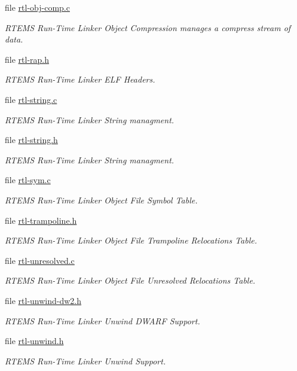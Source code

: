 \begin{DoxyCompactItemize}
file \mbox{\hyperlink{rtl-obj-comp_8c}{rtl-\/obj-\/comp.\+c}}
\begin{DoxyCompactList}\small\item\em R\+T\+E\+MS Run-\/\+Time Linker Object Compression manages a compress stream of data. \end{DoxyCompactList}\item 
file \mbox{\hyperlink{rtl-rap_8h}{rtl-\/rap.\+h}}
\begin{DoxyCompactList}\small\item\em R\+T\+E\+MS Run-\/\+Time Linker E\+LF Headers. \end{DoxyCompactList}\item 
file \mbox{\hyperlink{rtl-string_8c}{rtl-\/string.\+c}}
\begin{DoxyCompactList}\small\item\em R\+T\+E\+MS Run-\/\+Time Linker String managment. \end{DoxyCompactList}\item 
file \mbox{\hyperlink{rtl-string_8h}{rtl-\/string.\+h}}
\begin{DoxyCompactList}\small\item\em R\+T\+E\+MS Run-\/\+Time Linker String managment. \end{DoxyCompactList}\item 
file \mbox{\hyperlink{rtl-sym_8c}{rtl-\/sym.\+c}}
\begin{DoxyCompactList}\small\item\em R\+T\+E\+MS Run-\/\+Time Linker Object File Symbol Table. \end{DoxyCompactList}\item 
file \mbox{\hyperlink{rtl-trampoline_8h}{rtl-\/trampoline.\+h}}
\begin{DoxyCompactList}\small\item\em R\+T\+E\+MS Run-\/\+Time Linker Object File Trampoline Relocations Table. \end{DoxyCompactList}\item 
file \mbox{\hyperlink{rtl-unresolved_8c}{rtl-\/unresolved.\+c}}
\begin{DoxyCompactList}\small\item\em R\+T\+E\+MS Run-\/\+Time Linker Object File Unresolved Relocations Table. \end{DoxyCompactList}\item 
file \mbox{\hyperlink{rtl-unwind-dw2_8h}{rtl-\/unwind-\/dw2.\+h}}
\begin{DoxyCompactList}\small\item\em R\+T\+E\+MS Run-\/\+Time Linker Unwind D\+W\+A\+RF Support. \end{DoxyCompactList}\item 
file \mbox{\hyperlink{rtl-unwind_8h}{rtl-\/unwind.\+h}}
\begin{DoxyCompactList}\small\item\em R\+T\+E\+MS Run-\/\+Time Linker Unwind Support. \end{DoxyCompactList}\end{DoxyCompactItemize}



